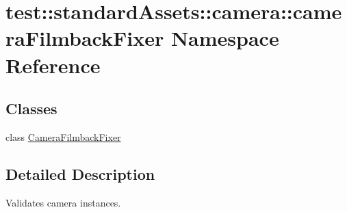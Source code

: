 \hypertarget{namespacetest_1_1standardAssets_1_1camera_1_1cameraFilmbackFixer}{\section{test\-:\-:standard\-Assets\-:\-:camera\-:\-:camera\-Filmback\-Fixer \-Namespace \-Reference}
\label{da/d76/namespacetest_1_1standardAssets_1_1camera_1_1cameraFilmbackFixer}
}
\subsection*{\-Classes}
\begin{DoxyCompactItemize}
\item 
class \hyperlink{classtest_1_1standardAssets_1_1camera_1_1cameraFilmbackFixer_1_1CameraFilmbackFixer}{\-Camera\-Filmback\-Fixer}
\end{DoxyCompactItemize}


\subsection{\-Detailed \-Description}
\begin{DoxyVerb}
Validates camera instances.
\end{DoxyVerb}
 